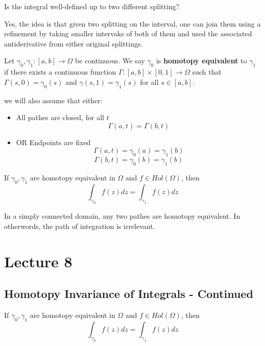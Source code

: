 \documentclass{article}
\begin{document}
\begin{question}
Is the integral well-defined up to two different splitting?
\end{question}

Yes, the idea is that given two splitting on the interval, one can join them using a refinement by taking smaller intervaks of both of them and used the associated antiderivative from either original splittings.

\begin{definition}
    Let $\gamma_0, \gamma_1: [a, b] \to \Omega$ be continuous. We say $\gamma_0$ is \textbf{homotopy equivalent} to $\gamma_1$ if there exists a continuous function $\Gamma: [a, b] \times [0, 1] \to \Omega$ such that $\Gamma(s, 0) = \gamma_0(s)$ and $\gamma(s, 1) = \gamma_1(s)$ for all $s \in [a, b]$.
\end{definition}

we will also assume that either:
        \begin{itemize}
            \item All pathes are closed, for all $t$
            \[\Gamma(a, t) = \Gamma(b, t)\]
            \item OR Endpoints are fixed
            \[\Gamma(a, t) = \gamma_0(a) = \gamma_1(b)\]
            \[\Gamma(b, t) = \gamma_0(b) = \gamma_1(b)\]
        \end{itemize}

\begin{theorem}
If $\gamma_0, \gamma_1$ are homotopy equivalent in $\Omega$ and $f \in Hol(\Omega)$, then
\[\int_{\gamma_0} f(z) dz = \int_{\gamma_1} f(z) dz\]
\end{theorem}

\begin{remark}
In a simply connected domain, any two pathes are homotopy equivalent. In otherwords, the path of integration is irrelevant.
\end{remark}

\newpage

\section{Lecture 8}

\subsection{Homotopy Invariance of Integrals - Continued}

\begin{theorem}
If $\gamma_0, \gamma_1$ are homotopy equivalent in $\Omega$ and $f \in Hol(\Omega)$, then
\[\int_{\gamma_0} f(z) dz = \int_{\gamma_1} f(z) dz\]
\end{theorem}
\end{document}
